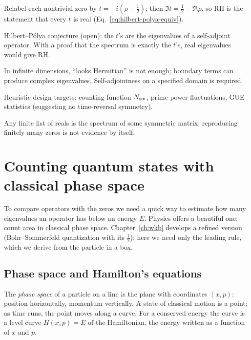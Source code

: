 \begin{keyideas}
\item Relabel each nontrivial zero by $t=-i(\rho-\tfrac12)$; then $\Im t=\tfrac12-\Re\rho$, so RH is the statement that every $t$ is real (Eq.~\eqref{eq:hilbert-polya-equiv}).
\item Hilbert--P\'olya conjecture (open): the $t$'s are the eigenvalues of a self-adjoint operator. With a proof that the spectrum is exactly the $t$'s, real eigenvalues would give RH.
\item In infinite dimensions, ``looks Hermitian'' is not enough; boundary terms can produce complex eigenvalues. Self-adjointness on a specified domain is required.
\item Heuristic design targets: counting function $N_{\mathrm{sm}}$, prime-power fluctuations, GUE statistics (suggesting no time-reversal symmetry).
\item Any finite list of reals is the spectrum of some symmetric matrix; reproducing finitely many zeros is not evidence by itself.
\end{keyideas}

\section{Counting quantum states with classical phase space}\label{sec:hilbert-polya-phase}

To compare operators with the zeros we need a quick way to estimate how many eigenvalues an operator has below an energy $E$. Physics offers a beautiful one: count area in classical phase space. Chapter~\ref{ch:wkb} develops a refined version (Bohr--Sommerfeld quantization with its $\tfrac12$); here we need only the leading rule, which we derive from the particle in a box.

\subsection{Phase space and Hamilton's equations}

The \emph{phase space} of a particle on a line is the plane with coordinates $(x,p)$: position horizontally, momentum vertically. A state of classical motion is a point; as time runs, the point moves along a curve. For a conserved energy the curve is a level curve $H(x,p)=E$ of the Hamiltonian, the energy written as a function of $x$ and $p$.

